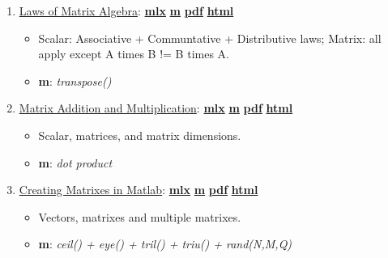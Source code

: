 \documentclass[
]{book}
\providecommand{\tightlist}{%
  \setlength{\itemsep}{0pt}\setlength{\parskip}{0pt}}
\begin{document}
\begin{enumerate}
\def\labelenumi{\arabic{enumi}.}
\tightlist
\item
  \href{https://Math4Econ.github.io/matrix_basics/htmlpdfm/matlab_define_matrix.html}{Laws of Matrix Algebra}: \href{https://github.com/Math4Econ/Math4Econ.github.io/blob/main/matrix_basics/matlab_define_matrix.mlx}{\textbf{mlx}} \textbar{} \href{https://github.com/Math4Econ/Math4Econ.github.io/blob/main/matrix_basics/htmlpdfm/matlab_define_matrix.m}{\textbf{m}} \textbar{} \href{https://github.com/Math4Econ/Math4Econ.github.io/blob/main/matrix_basics/htmlpdfm/matlab_define_matrix.pdf}{\textbf{pdf}} \textbar{} \href{https://Math4Econ.github.io/matrix_basics/htmlpdfm/matlab_define_matrix.html}{\textbf{html}}

  \begin{itemize}
  \tightlist
  \item
    Scalar: Associative + Communtative + Distributive laws; Matrix: all apply except A times B != B times A.
  \item
    \textbf{m}: \emph{transpose()}
  \end{itemize}
\item
  \href{https://Math4Econ.github.io/matrix_basics/htmlpdfm/matrix_algebra_rules.html}{Matrix Addition and Multiplication}: \href{https://github.com/Math4Econ/Math4Econ.github.io/blob/main/matrix_basics/matrix_algebra_rules.mlx}{\textbf{mlx}} \textbar{} \href{https://github.com/Math4Econ/Math4Econ.github.io/blob/main/matrix_basics/htmlpdfm/matrix_algebra_rules.m}{\textbf{m}} \textbar{} \href{https://github.com/Math4Econ/Math4Econ.github.io/blob/main/matrix_basics/htmlpdfm/matrix_algebra_rules.pdf}{\textbf{pdf}} \textbar{} \href{https://Math4Econ.github.io/matrix_basics/htmlpdfm/matrix_algebra_rules.html}{\textbf{html}}

  \begin{itemize}
  \tightlist
  \item
    Scalar, matrices, and matrix dimensions.
  \item
    \textbf{m}: \emph{dot product}
  \end{itemize}
\item
  \href{https://Math4Econ.github.io/matrix_basics/htmlpdfm/matrix_matlab.html}{Creating Matrixes in Matlab}: \href{https://github.com/Math4Econ/Math4Econ.github.io/blob/main/matrix_basics/matrix_matlab.mlx}{\textbf{mlx}} \textbar{} \href{https://github.com/Math4Econ/Math4Econ.github.io/blob/main/matrix_basics/htmlpdfm/matrix_matlab.m}{\textbf{m}} \textbar{} \href{https://github.com/Math4Econ/Math4Econ.github.io/blob/main/matrix_basics/htmlpdfm/matrix_matlab.pdf}{\textbf{pdf}} \textbar{} \href{https://Math4Econ.github.io/matrix_basics/htmlpdfm/matrix_matlab.html}{\textbf{html}}

  \begin{itemize}
  \tightlist
  \item
    Vectors, matrixes and multiple matrixes.
  \item
    \textbf{m}: \emph{ceil() + eye() + tril() + triu() + rand(N,M,Q)}
  \end{itemize}
\end{enumerate}
\end{document}
